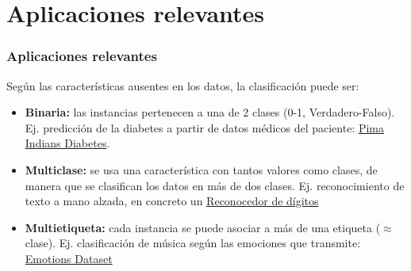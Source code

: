 \documentclass[8pt]{beamer}
\newcommand{\hlink}[2]{{\color{blue}\href{#1}{#2}}}
\begin{document}
\section{Aplicaciones relevantes}
  \begin{frame}
   \frametitle{Aplicaciones relevantes}
   Según las características ausentes en los datos, la clasificación puede ser:
   \pause
   \begin{itemize}[<+->]
    \item \textbf{Binaria:} las instancias pertenecen a una de 2 clases (0-1, Verdadero-Falso). Ej.
      predicción de la diabetes a partir de datos médicos del paciente:
      \hlink{https://archive.ics.uci.edu/ml/datasets/Pima+Indians+Diabetes}{Pima Indians Diabetes}.
    \item \textbf{Multiclase:} se usa una característica con tantos valores como clases, de
      manera que se clasifican los datos en más de dos clases. Ej. reconocimiento de texto a mano alzada, en concreto un
    \hlink{https://www.kaggle.com/c/digit-recognizer}{Reconocedor de dígitos}
    \item \textbf{Multietiqueta:} cada instancia se puede asociar a más de una etiqueta ($\approx$ clase). Ej. clasificación de música según las emociones que transmite: \hlink{http://mlkd.csd.auth.gr/publication_details.asp?publicationID=269}{Emotions Dataset}
    
   \end{itemize}

   
  \end{frame}
\end{document}
